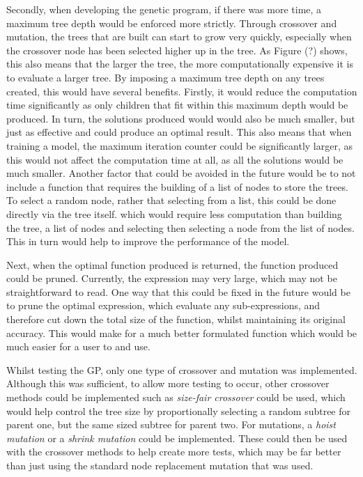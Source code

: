 \documentclass[11pt]{article}
\begin{document}
Secondly, when developing the genetic program, if there was more time, a maximum tree depth would be enforced more strictly. Through crossover and mutation, the trees that are built can start to grow very quickly, especially when the crossover node has been selected higher up in the tree. As Figure (?) shows, this also means that the larger the tree, the more computationally expensive it is to evaluate a larger tree. By imposing a maximum tree depth on any trees created, this would have several benefits. Firstly, it would reduce the computation time significantly as only children that fit within this maximum depth would be produced. In turn, the solutions produced would would also be much smaller, but just as effective and could produce an optimal result. This also means that when training a model, the maximum iteration counter could be significantly larger, as this would not affect the computation time at all, as all the solutions would be much smaller.
Another factor that could be avoided in the future would be to not include a function that requires the building of a list of nodes to store the trees. To select a random node, rather that selecting from a list, this could be done directly via the tree itself. which would require less computation than building the tree, a list of nodes and selecting then selecting a node from the list of nodes. This in turn would help to improve the performance of the model.  

Next, when the optimal function produced is returned, the function produced could be pruned. Currently, the expression may very large, which may not be straightforward to read. One way that this could be fixed in the future would be to prune the optimal expression, which evaluate any sub-expressions, and therefore cut down the total size of the function, whilst maintaining its original accuracy. This would make for a much better formulated function which would be much easier for a user to and use. 

Whilst testing the GP, only one type of crossover and mutation was implemented. Although this was sufficient, to allow more testing to occur, other crossover methods could be implemented such as \textit{size-fair crossover} could be used, which would help control the tree size by proportionally selecting a random subtree for parent one, but the same sized subtree for parent two. For mutations, a \textit{hoist mutation} or a \textit{shrink mutation} could be implemented. These could then be used with the crossover methods to help create more tests, which may be far better than just using the standard node replacement mutation that was used. 
\end{document}
